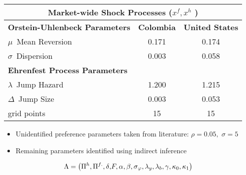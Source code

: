 \documentclass[notes=show]{beamer}
\begin{document}
\begin{frame}%

\begin{flushleft}

\end{flushleft}

\begin{center}
\begin{tabular}{lcc}
\hline\hline
\multicolumn{3}{c}{\textbf{Market-wide Shock Processes (}$x^{f},x^{h}$%
\textbf{)}} \\ \hline
\textbf{Orstein-Uhlenbeck Parameters} & \textbf{Colombia} & \textbf{United
States} \\ \hline
$\mu ${\small \ Mean Reversion} & {\small 0.171} & {\small 0.174} \\ 
$\sigma ${\small \ Dispersion} & {\small 0.003} & {\small 0.058} \\ \hline
\textbf{Ehrenfest Process Parameters} &  &  \\ \hline
$\lambda ${\small \ Jump Hazard} & {\small 1.200} & {\small 1.215} \\ 
$\Delta ${\small \ Jump Size} & {\small 0.003} & {\small 0.053} \\ 
{\small grid points} & {\small 15} & {\small 15} \\ \hline
\end{tabular}
\end{center}

\end{frame}%
\begin{frame}%



\begin{itemize}
\item Unidentified preference parameters taken from literature: $\rho =0.05,$
$\sigma =5$

\item Remaining parameters identified using indirect inference
\end{itemize}

\[
\Lambda =\left( {\small \Pi }^{h},{\small \Pi }^{f.},{\small \delta ,}F,%
{\small \alpha },{\small \beta },\sigma _{\varphi },\lambda _{y},{\small %
\lambda }_{b},{\small \gamma ,\kappa _{0},\kappa _{1}}\right) 
\]

\end{frame}%
\end{document}
